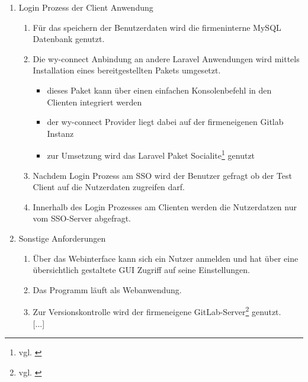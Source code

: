 \begin{enumerate}[itemsep=0em,partopsep=0em,parsep=0em,topsep=0em]
\item Login Prozess der Client Anwendung
		\begin{enumerate}
		\item Für das speichern der Benutzerdaten wird die firmeninterne MySQL Datenbank genutzt. 
		\item Die wy-connect Anbindung an andere Laravel Anwendungen wird mittels Installation eines bereitgestellten Pakets umgesetzt.
		\begin{itemize}
		\item dieses Paket kann über einen einfachen Konsolenbefehl in den Clienten integriert werden
		\item der wy-connect Provider liegt dabei auf der firmeneigenen Gitlab Instanz
		\item zur Umsetzung wird das Laravel Paket Socialite\footnote{vgl. \cite{Socialite}} genutzt
	\end{itemize}
		\item Nachdem Login Prozess am \acs{SSO} wird der Benutzer gefragt ob der Test Client auf die Nutzerdaten zugreifen darf.
		\item Innerhalb des Login Prozesses am Clienten werden die Nutzerdatzen nur vom \acs{SSO}-Server abgefragt.
		\end{enumerate}
\item Sonstige Anforderungen
		\begin{enumerate}
		\item Über das Webinterface kann sich ein Nutzer anmelden und hat über eine übersichtlich gestaltete  \acs{GUI} Zugriff auf seine Einstellungen.
		\item Das Programm läuft als Webanwendung.
		\item Zur Versionskontrolle wird der firmeneigene GitLab-Server\footnote{vgl. \cite{GitLab}} genutzt.\\
		{[...]}
		\end{enumerate}
\end{enumerate}

